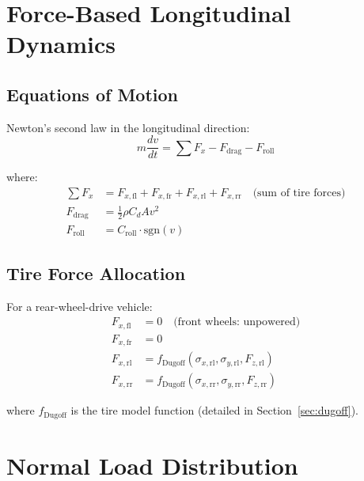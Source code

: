 \documentclass[11pt,a4paper]{article}
\begin{document}
\section{Force-Based Longitudinal Dynamics}

\subsection{Equations of Motion}

Newton's second law in the longitudinal direction:
\begin{equation}
m \frac{dv}{dt} = \sum F_x - F_{\text{drag}} - F_{\text{roll}}
\end{equation}

where:
\begin{align}
\sum F_x &= F_{x,\text{fl}} + F_{x,\text{fr}} + F_{x,\text{rl}} + F_{x,\text{rr}} \quad \text{(sum of tire forces)} \\
F_{\text{drag}} &= \frac{1}{2} \rho C_d A v^2 \\
F_{\text{roll}} &= C_{\text{roll}} \cdot \text{sgn}(v)
\end{align}

\subsection{Tire Force Allocation}

For a rear-wheel-drive vehicle:
\begin{align}
F_{x,\text{fl}} &= 0 \quad \text{(front wheels: unpowered)} \\
F_{x,\text{fr}} &= 0 \\
F_{x,\text{rl}} &= f_{\text{Dugoff}}(\sigma_{x,\text{rl}}, \sigma_{y,\text{rl}}, F_{z,\text{rl}}) \\
F_{x,\text{rr}} &= f_{\text{Dugoff}}(\sigma_{x,\text{rr}}, \sigma_{y,\text{rr}}, F_{z,\text{rr}})
\end{align}

where $f_{\text{Dugoff}}$ is the tire model function (detailed in Section~\ref{sec:dugoff}).

\section{Normal Load Distribution}
\end{document}

